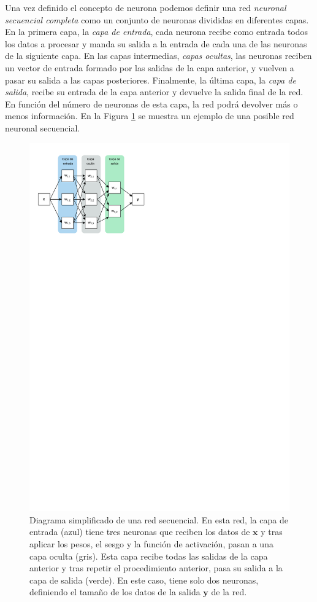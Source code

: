 Una vez definido el concepto de neurona podemos definir una red \textit{neuronal secuencial completa} como un conjunto de neuronas divididas en diferentes capas. En la primera capa, la \textit{capa de entrada}, cada neurona recibe como entrada todos los datos a procesar y manda su salida a la entrada de cada una de las neuronas de la siguiente capa. En las capas intermedias, \textit{capas ocultas}, las neuronas reciben un vector de entrada formado por las salidas de la capa anterior, y vuelven a pasar su salida a las capas posteriores. Finalmente, la última capa, la \textit{capa de salida}, recibe su entrada de la capa anterior y devuelve la salida final de la red. En función del número de neuronas de esta capa, la red podrá devolver más o menos información. En la Figura \ref{fig:diagram-sec} se muestra un ejemplo de una posible red neuronal secuencial.

\begin{figure}[h]
  \centering
  \includegraphics{figures/diagram-secuential.pdf}
  \caption{Diagrama simplificado de una red secuencial. En esta red, la capa de entrada (azul) tiene tres neuronas que reciben los datos de $ \mathbf{x} $ y tras aplicar los pesos, el sesgo y la función de activación, pasan a una capa oculta (gris). Esta capa recibe todas las salidas de la capa anterior y tras repetir el procedimiento anterior, pasa su salida a la capa de salida (verde). En este caso, tiene solo dos neuronas, definiendo el tamaño de los datos de la salida $ \mathbf{y} $ de la red.}
  \label{fig:diagram-sec}
\end{figure}

